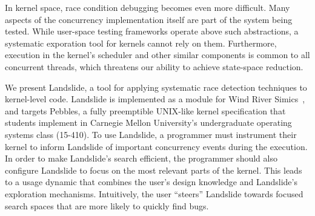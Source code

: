 \documentclass{llncs}
\begin{document}
In kernel space, race condition debugging becomes even more difficult. Many aspects of the concurrency implementation itself are part of the system being tested.
While user-space testing frameworks operate above such abstractions, a systematic exporation tool for kernels cannot rely on them.
Furthermore, execution in the kernel's scheduler and other similar components is common to all concurrent threads, which threatens our ability to achieve state-space reduction.



We present Landslide,
a tool for applying systematic race detection techniques to kernel-level code.
Landslide is implemented as a module for Wind River Simics\textsuperscript{\texttrademark}~\cite{simics}, and targets Pebbles, a fully preemptible UNIX-like kernel specification that students implement in Carnegie Mellon University's undergraduate operating systems class (15-410).
To use Landslide, a programmer must instrument their kernel to inform Landslide of important concurrency events during the execution. In order to make Landslide's search efficient, the programmer should also configure Landslide to focus on the most relevant parts of the kernel.
This leads to a usage dynamic that combines the user's design knowledge and Landslide's exploration mechanisms. Intuitively, the user ``steers'' Landslide towards focused search spaces that are more likely to quickly find bugs.
\end{document}
